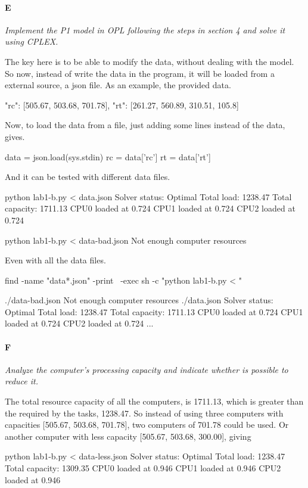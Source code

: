\documentclass[11pt,a4paper,twocolumn]{article}
\begin{document}
\paragraph*{E}
\textsl{Implement the P1 model in OPL following the steps in section 4 and solve 
it using CPLEX.}

The key here is to be able to modify the data, without dealing with the model.  
So now, instead of write the data in the program, it will be loaded from a 
external source, a json file. As an example, the provided data.
\begin{pycode}
{
	"rc": [505.67, 503.68, 701.78],
	"rt": [261.27, 560.89, 310.51, 105.8]
}
\end{pycode}
%
Now, to load the data from a file, just adding some lines instead of the data, 
gives.
%
\begin{pycode}
data = json.load(sys.stdin)
rc = data['rc']
rt = data['rt']
\end{pycode}
%
And it can be tested with different data files.
%
\begin{pycode}
python lab1-b.py < data.json
Solver status: Optimal
Total load: 1238.47
Total capacity: 1711.13
CPU0 loaded at 0.724
CPU1 loaded at 0.724
CPU2 loaded at 0.724

python lab1-b.py < data-bad.json
Not enough computer resources
\end{pycode}
%
Even with all the data files. 
%
\begin{pycode}
find -name "data*.json" -print \
	-exec sh -c "python lab1-b.py < {}" \;

./data-bad.json
Not enough computer resources
./data.json
Solver status: Optimal
Total load: 1238.47
Total capacity: 1711.13
CPU0 loaded at 0.724
CPU1 loaded at 0.724
CPU2 loaded at 0.724
...
\end{pycode}

\paragraph*{F}
\textsl{Analyze the computer's processing capacity and indicate whether is 
possible to reduce it.}

The total resource capacity of all the computers, is 1711.13, which is greater 
than the required by the tasks, 1238.47. So instead of using three computers 
with capacities [505.67, 503.68, 701.78], two computers of 701.78 could be used.  
Or another computer with less capacity [505.67, 503.68, 300.00], giving

\begin{pycode}
python lab1-b.py < data-less.json 
Solver status: Optimal
Total load: 1238.47
Total capacity: 1309.35
CPU0 loaded at 0.946
CPU1 loaded at 0.946
CPU2 loaded at 0.946
\end{pycode}
\end{document}
